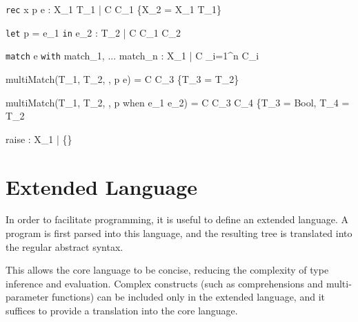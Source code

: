 \documentclass{article}
\begin{document}
    {\Gamma \vdash \texttt{rec} \; x \; p \Rightarrow e : X_1 \rightarrow T_1 \; | \; C \cup C_1 \cup \{X_2 = X_1 \rightarrow T_1\}}

\bigskip

    {\Gamma \vdash \texttt{let} \; p = e_1 \; \texttt{in} \; e_2 : T_2 \; | \; C \cup C_1 \cup C_2}

\bigskip

    {\Gamma \vdash \texttt{match} \; e \; \texttt{with} \; match_1, ... \; match_n : X_1 \; | \; C \cup \displaystyle \bigcup_{i=1}^{n} C_i}

\medskip

  {multiMatch(T_1, T_2, \Gamma, p \rightarrow e) = C \cup C_3 \cup \{T_3 = T_2\}}

  {multiMatch(T_1, T_2, \Gamma, p \; \mbox{when} \; e_1 \rightarrow e_2) = C \cup C_3 \cup C_4 \cup \{T_3 = Bool, T_4 = T_2}


\bigskip

    {\Gamma \vdash raise : X_1 \; | \; \{\}}

\newpage

\section{Extended Language}

In order to facilitate programming, it is useful to define an extended language.
A program is first parsed into this language, and the resulting tree is translated into the regular abstract syntax.

This allows the core language to be concise, reducing the complexity of type inference and evaluation.
Complex constructs (such as comprehensions and multi-parameter functions) can be included only in the extended language, and it suffices to provide a translation into the core language.
\end{document}
